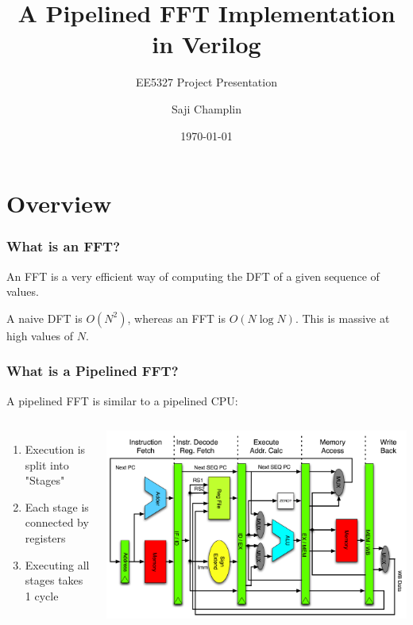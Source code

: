 \documentclass{beamer}
\title[Pipelined FFT]{A Pipelined FFT Implementation in Verilog}
\author{Saji Champlin}
\institute{University of Minnesota}
\date{\today}
\subtitle{EE5327 Project Presentation}
\begin{document}
\frame{\titlepage}

\section{Overview}

\begin{frame}
	\frametitle{What is an FFT?}

	An FFT is a very efficient way of computing the DFT of a given sequence of values.

	A naive DFT is $O(N^2)$, whereas an FFT is $O(N \log{N})$. This is massive at high
	values of $N$.

\end{frame}

\begin{frame}
	\frametitle{What is a Pipelined FFT?}
	A pipelined FFT is similar to a pipelined CPU:
	\begin{columns}
		\begin{enumerate}
			\item Execution is split into "Stages"
			\pause
			\item Each stage is connected by registers
			\pause
			\item Executing all stages takes 1 cycle
		\end{enumerate}
		\onslide
		\centering
		\includegraphics[width=\linewidth]{Pipeline_MIPS.png}
	\end{columns}

\end{frame}
\end{document}
